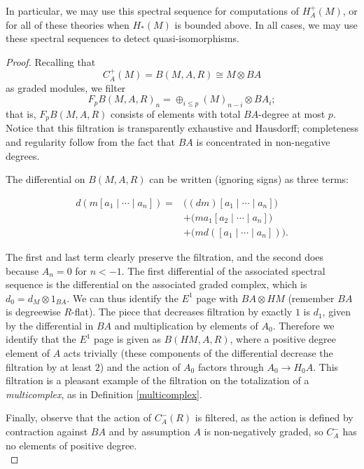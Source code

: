\documentclass{memo-l}
\theoremstyle{definition}
\theoremstyle{remark}
\numberwithin{section}{chapter}
\numberwithin{equation}{chapter}
\begin{document}
In particular, we may use this spectral sequence for computations of $H^+_A(M)$, or for all of these theories when $H_*(M)$ is bounded above. In all cases, we may use these spectral sequences to detect quasi-isomorphisms. 

\begin{proof}
Recalling that $$C^+_A(M) = B(M,A,R) \cong M \otimes BA$$ as graded modules, we filter $$F_p B(M, A, R)_n = \oplus_{i \leq p} (M)_{n-i} \otimes BA_{i};$$ that is, $F_p B(M,A,R)$ consists of elements with total $BA$-degree at most $p$. Notice that this filtration is transparently exhaustive and Hausdorff; completeness and regularity follow from the fact that $BA$ is concentrated in non-negative degrees.

The differential on $B(M,A,R)$ can be written (ignoring signs) as three terms:

\begin{align*}d(m[a_1 \mid \cdots \mid a_n]) =& \big ((dm) [a_1 \mid \cdots \mid a_n]\big )\\ &+ \big (m a_1[a_2 \mid \cdots \mid  a_n]\big )\\ &+ \big (m d([a_1 \mid \cdots \mid a_n])\big ).\end{align*}

The first and last term clearly preserve the filtration, and the second does because $A_n = 0$ for $n < -1$. The first differential of the associated spectral sequence is the differential on the associated graded complex, which is $d_0 = d_M \otimes 1_{BA}$. We can thus identify the $E^1$ page with $BA \otimes HM$ (remember $BA$ is degreewise $R$-flat). The piece that decreases filtration by exactly $1$ is $d_1$, given by the differential in $BA$ and multiplication by elements of $A_0$. Therefore we identify that the $E^1$ page is given as $B(HM, A, R)$, where a positive degree element of $A$ acts trivially (these components of the differential decrease the filtration by at least $2$) and the action of $A_0$ factors through $A_0 \to H_0 A$. This filtration is a pleasant example of the filtration on the totalization of a \textit{multicomplex}, as in Definition \ref{multicomplex}. 

Finally, observe that the action of $C^-_A(R)$ is filtered, as the action is defined by contraction against $BA$ and by assumption $A$ is non-negatively graded, so $C^-_A$ has no elements of positive degree.\\


\end{proof}
\end{document}
